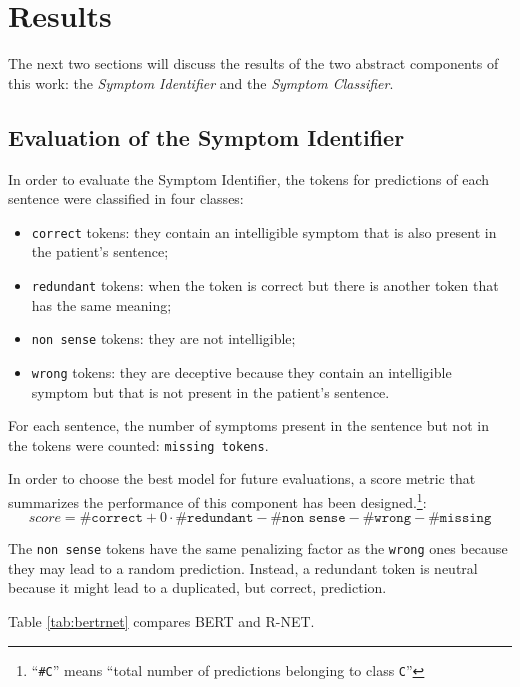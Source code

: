 \chapter{Results}
\label{cha:results}
The next two sections will discuss the results of the two abstract components of this work: the \textit{Symptom Identifier} and the \textit{Symptom Classifier}.

\section{Evaluation of the Symptom Identifier}
\label{sec:eval_symptom_identifier}
In order to evaluate the Symptom Identifier, the tokens for predictions of each sentence were classified in four classes:
\begin{itemize}
  \item \texttt{correct} tokens: they contain an intelligible symptom that is also present in the patient's sentence;
  \item \texttt{redundant} tokens: when the token is correct but there is another token that has the same meaning;
  \item \texttt{non sense} tokens: they are not intelligible;
  \item \texttt{wrong} tokens: they are deceptive because they contain an intelligible symptom but that is not present in the patient's sentence.
\end{itemize}

For each sentence, the number of symptoms present in the sentence but not in the tokens were counted: \texttt{missing tokens}.

In order to choose the best model for future evaluations, a score metric that summarizes the performance of this component has been designed.\footnote{``\texttt{\#C}'' means ``total number of predictions belonging to class \texttt{C}''}:
\begin{equation}
score = \texttt{\#correct} + 0 \cdot \texttt{\#redundant} - \texttt{\#non sense} - \texttt{\#wrong} - \texttt{\#missing}
\end{equation}

The \texttt{non sense} tokens have the same penalizing factor as the \texttt{wrong} ones because they may lead to a random prediction. Instead, a redundant token is neutral because it might lead to a duplicated, but correct, prediction.

Table \ref{tab:bertrnet} compares BERT and R-NET.


